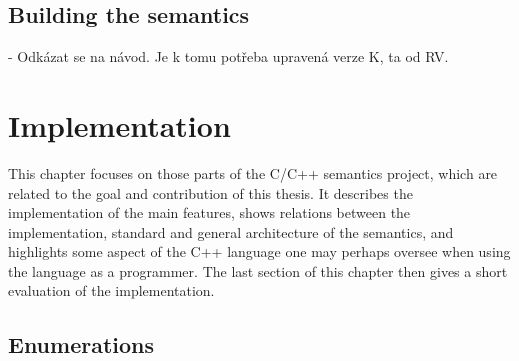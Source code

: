 \documentclass{fithesis3}
\begin{document}





\section{Building the semantics}
- Odkázat se na návod. Je k tomu potřeba upravená verze K, ta od RV.

\chapter{Implementation}

This chapter focuses on those parts of the C/C++ semantics project, which are related to the goal and contribution of this thesis. It describes the implementation of the main features, shows relations between the implementation, standard and general architecture of the semantics, and highlights some aspect of the C++ language one may perhaps oversee when using the language as a programmer. The last section of this chapter then gives a short evaluation of the implementation.

	


\section{Enumerations}


\end{document}
